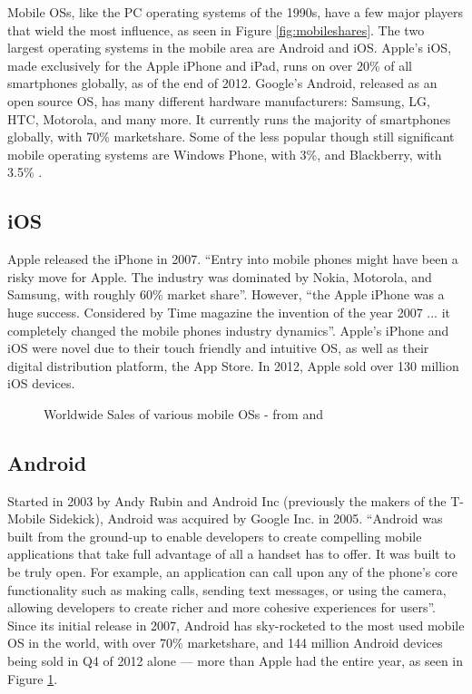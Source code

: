 \documentclass{acm_proc_article-sp}
\begin{document}
Mobile OSs, like the PC operating systems of the 1990s, have a few major players that wield the most influence, as seen in Figure \ref{fig:mobileshares}. The two largest operating systems in the mobile area are Android and iOS. Apple's iOS, made exclusively for the Apple iPhone and iPad, runs on over 20\%\citep{gartnerq42012} of all smartphones globally, as of the end of 2012. Google's Android, released as an open source OS, has many different hardware manufacturers: Samsung, LG, HTC, Motorola, and many more. It currently runs the majority of smartphones globally, with 70\%\citep{gartnerq42012}  marketshare. Some of the less popular though still significant mobile operating systems are Windows Phone, with 3\%, and Blackberry, with 3.5\%\citep{gartnerq42012} . 

\subsection{iOS}
Apple released the iPhone in 2007. ``Entry into mobile phones might have been a risky move for Apple. The industry was dominated by Nokia, Motorola, and Samsung, with roughly 60\% market share''\citep{yoffie2010apple}. However, ``the Apple iPhone was a huge success. Considered by Time magazine the invention of the year 2007 ... it completely changed the mobile phones industry dynamics''\citep{reis2012leadership}. Apple's iPhone and iOS were novel due to their touch friendly and intuitive OS, as well as their digital distribution platform, the App Store\citep{yoffie2010apple}. In 2012, Apple sold over 130 million iOS devices\citep{gartnerq42012}.

\begin{figure}[h]
\begin{center}
\caption{Worldwide Sales of various mobile OSs - from \citep{wikimobilesales} and \citep{gartnerq42012}}
\label{fig:mobilesales}
\end{center}
\end{figure}


\subsection{Android}
Started in 2003 by Andy Rubin and Android Inc (previously the makers of the T-Mobile Sidekick), Android was acquired by Google Inc. in 2005\citep{businessweek2005}. ``Android was built from the ground-up to enable developers to create compelling mobile applications that take full advantage of all a handset has to offer. It was built to be truly open. For example, an application can call upon any of the phone's core functionality such as making calls, sending text messages, or using the camera, allowing developers to create richer and more cohesive experiences for users''\citep{ohaandroidoverview}. Since its initial release in 2007\citep{oharelease2007}, Android has sky-rocketed to the most used mobile OS in the world, with over 70\% marketshare, and 144 million Android devices being sold in Q4 of 2012 alone\citep{gartnerq42012} --- more than Apple had the entire year, as seen in Figure \ref{fig:mobilesales}.
\end{document}
